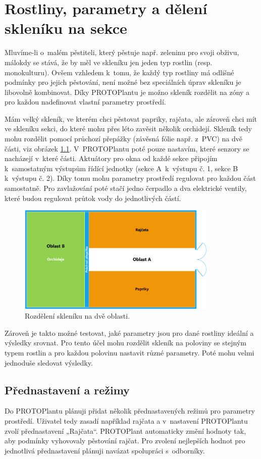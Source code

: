 \chapter{Rostliny, parametry a dělení skleníku na sekce}
Mluvíme-li o~malém pěstiteli, který pěstuje např. zeleninu pro svoji obživu, málokdy se stává, že by měl ve skleníku jen jeden typ rostlin (resp. monokulturu).
Ovšem vzhledem k~tomu, že každý typ rostliny má odlišné podmínky pro jejich pěstování, není možné bez speciálních úprav skleníku je libovolně kombinovat.
Díky PROTOPlantu je možno skleník rozdělit na zóny a pro každou nadefinovat vlastní parametry prostředí.
\newline

\noindent{}

Mám velký skleník, ve kterém chci pěstovat papriky, rajčata, ale zároveň chci mít ve skleníku sekci, do které mohu přes léto zavěsit několik orchidejí.
Skleník tedy mohu rozdělit pomocí průchozí přepážky (závěsná fólie např. z~PVC) na dvě části, viz obrázek \ref{fig:separationA}.
V~PROTOPlantu poté pouze nastavím, které senzory se nacházejí v~které části.
Aktuátory pro okna od každé sekce připojím k~samostatným výstupům řídící jednotky (sekce A~k~výstupu č. 1, sekce B k~výstupu č. 2).
Díky tomu mohu parametry prostředí regulovat pro každou část samostatně.
Pro zavlažování poté stačí jedno čerpadlo a dva elektrické ventily, které budou regulovat průtok vody do jednotlivých částí.
\begin{figure}[htbp]
    \centering
    \includegraphics[width=0.85\textwidth]{img/Rozdeleni_Skleniku_A.png}
    \caption{Rozdělení skleníku na dvě oblasti.}
    \label{fig:separationA}
\end{figure}

Zároveň je takto možné testovat, jaké parametry jsou pro dané rostliny ideální a výsledky srovnat.
Pro tento účel mohu rozdělit skleník na poloviny se stejným typem rostlin a pro každou polovinu nastavit různé parametry.
Poté mohu velmi jednoduše sledovat výsledky.

\section{Přednastavení a režimy}
Do PROTOPlantu plánuji přidat několik přednastavených režimů pro parametry prostředí.
Uživatel tedy zasadí například rajčata a v~nastavení PROTOPlantu zvolí přednastavení „Rajčata“.
PROTOPlant automaticky změní hodnoty tak, aby podmínky vyhovovaly pěstování rajčat.
Pro zvolení nejlepších hodnot pro jednotlivá přednastavení plánuji navázat spolupráci s~odborníky.

\newpage